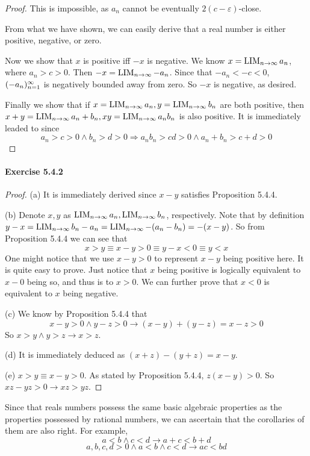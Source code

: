 \begin{proof}
This is impossible, as $a_n$ cannot be eventually $2(c-\varepsilon)$-close.

From what we have shown, we can easily derive that a real number is either positive, negative, or zero.

Now we show that $x$ is positive iff $-x$ is negative. We know $x = \operatorname*{LIM}_{n \to \infty}{a_n}$, where $a_n > c>0$. Then 
$-x = \operatorname*{LIM}_{n \to \infty}{-a_n}$. Since that $-a_n < -c <0$, $(-a_n)^\infty_{n=1}$ is negatively bounded away from zero. So $-x$ is 
negative, as desired.

Finally we show that if $x=\operatorname*{LIM}_{n \to \infty}{a_n},y=\operatorname*{LIM}_{n \to \infty}{b_n}$ are both positive, then $x+y=\operatorname*{LIM}_{n \to \infty}{a_n+b_n},xy = \operatorname*{LIM}_{n \to \infty}{a_nb_n}$ is also 
positive. It is immediately leaded to since 
\[
a_n >c>0 \wedge b_n >d>0 \Longrightarrow a_nb_n > cd>0 \wedge a_n+b_n > c+d>0
\]
\end{proof}

\paragraph{Exercise 5.4.2} \label{exercise5.4.2}
\begin{proof}
(a) It is immediately derived since $x-y$ satisfies Proposition 5.4.4.

(b)
Denote $x,y$ as $\operatorname*{LIM}_{n \to \infty}{a_n},\operatorname*{LIM}_{n \to \infty}{b_n}$, respectively. Note that by definition 
$y-x = \operatorname*{LIM}_{n \to \infty}{b_n-a_n} = \operatorname*{LIM}_{n \to \infty}{-(a_n-b_n)} = -(x-y)$. So from Proposition 5.4.4 we can see that
\[
x>y \equiv x-y>0 \equiv y-x<0 \equiv y<x
\]
One might notice that we use $x-y>0$ to represent $x-y$ being positive here. It is quite easy to prove. Just notice that 
$x$ being positive is logically equivalent to $x-0$ being so, and thus is to $x>0$. We can further prove that $x<0$ is 
equivalent to $x$ being negative.

(c)
We know by Proposition 5.4.4 that 
\[
x-y >0 \wedge y-z>0 \longrightarrow (x-y)+(y-z) = x-z >0
\]
So $x>y \wedge y>z \longrightarrow x>z$.

(d)
It is immediately deduced as $(x+z)-(y+z) = x-y$.

(e)
$x>y \equiv x-y>0$. As stated by Proposition 5.4.4, $z(x-y) >0$. So $xz-yz>0 \longrightarrow xz>yz$.

\end{proof}

\begin{prop} \label{prop.5.4.basicproperties}
Since that reals numbers possess the same basic algebraic properties as the properties possessed by rational numbers, we 
can ascertain that the corollaries of them are also right. For example,
\[
a<b\wedge c<d \longrightarrow a+c<b+d
\]
\[
a,b,c,d>0\wedge a<b\wedge c<d \longrightarrow ac<bd
\]
\end{prop}


